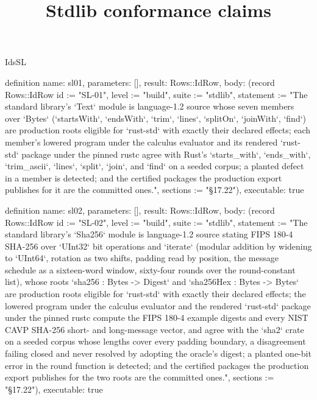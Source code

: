 \begin{lexlean}{IdsSL}
\title{Stdlib conformance claims}
\begin{semanticmodule}
definition{
  name: sl01,
  parameters: [],
  result: Rows::IdRow,
  body: (record Rows::IdRow {id := "SL-01", level := "build", suite := "stdlib", statement := "The standard library's `Text` module is language-1.2 source whose seven members over `Bytes` (`startsWith`, `endsWith`, `trim`, `lines`, `splitOn`, `joinWith`, `find`) are production roots eligible for `rust-std` with exactly their declared effects; each member's lowered program under the calculus evaluator and its rendered `rust-std` package under the pinned rustc agree with Rust's `starts_with`, `ends_with`, `trim_ascii`, `lines`, `split`, `join`, and `find` on a seeded corpus; a planted defect in a member is detected; and the certified packages the production export publishes for it are the committed ones.", sections := "§17.22"}),
  executable: true
}

definition{
  name: sl02,
  parameters: [],
  result: Rows::IdRow,
  body: (record Rows::IdRow {id := "SL-02", level := "build", suite := "stdlib", statement := "The standard library's `Sha256` module is language-1.2 source stating FIPS 180-4 SHA-256 over `UInt32` bit operations and `iterate` (modular addition by widening to `UInt64`, rotation as two shifts, padding read by position, the message schedule as a sixteen-word window, sixty-four rounds over the round-constant list), whose roots `sha256 : Bytes -> Digest` and `sha256Hex : Bytes -> Bytes` are production roots eligible for `rust-std` with exactly their declared effects; the lowered program under the calculus evaluator and the rendered `rust-std` package under the pinned rustc compute the FIPS 180-4 example digests and every NIST CAVP SHA-256 short- and long-message vector, and agree with the `sha2` crate on a seeded corpus whose lengths cover every padding boundary, a disagreement failing closed and never resolved by adopting the oracle's digest; a planted one-bit error in the round function is detected; and the certified packages the production export publishes for the two roots are the committed ones.", sections := "§17.22"}),
  executable: true
}


\end{semanticmodule}
\end{lexlean}
